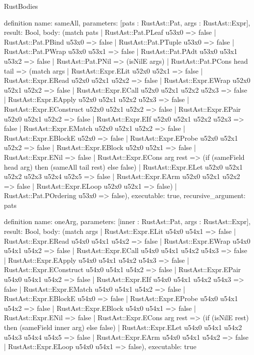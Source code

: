 \begin{lexlean}{RustBodies}
\begin{semanticmodule}
definition{
  name: sameAll,
  parameters: [pats : RustAst::Pat, args : RustAst::Expr],
  result: Bool,
  body: (match pats
    | RustAst::Pat.PLeaf u53x0 => false
    | RustAst::Pat.PBind u53x0 => false
    | RustAst::Pat.PTuple u53x0 => false
    | RustAst::Pat.PWrap u53x0 u53x1 => false
    | RustAst::Pat.PAdt u53x0 u53x1 u53x2 => false
    | RustAst::Pat.PNil => (isNilE args)
    | RustAst::Pat.PCons head tail => (match args
      | RustAst::Expr.ELit u52x0 u52x1 => false
      | RustAst::Expr.ERead u52x0 u52x1 u52x2 => false
      | RustAst::Expr.EWrap u52x0 u52x1 u52x2 => false
      | RustAst::Expr.ECall u52x0 u52x1 u52x2 u52x3 => false
      | RustAst::Expr.EApply u52x0 u52x1 u52x2 u52x3 => false
      | RustAst::Expr.EConstruct u52x0 u52x1 u52x2 => false
      | RustAst::Expr.EPair u52x0 u52x1 u52x2 => false
      | RustAst::Expr.EIf u52x0 u52x1 u52x2 u52x3 => false
      | RustAst::Expr.EMatch u52x0 u52x1 u52x2 => false
      | RustAst::Expr.EBlockE u52x0 => false
      | RustAst::Expr.EProbe u52x0 u52x1 u52x2 => false
      | RustAst::Expr.EBlock u52x0 u52x1 => false
      | RustAst::Expr.ENil => false
      | RustAst::Expr.ECons arg rest => (if (sameField head arg) then (sameAll tail rest) else false)
      | RustAst::Expr.ELet u52x0 u52x1 u52x2 u52x3 u52x4 u52x5 => false
      | RustAst::Expr.EArm u52x0 u52x1 u52x2 => false
      | RustAst::Expr.ELoop u52x0 u52x1 => false)
    | RustAst::Pat.POrdering u53x0 => false),
  executable: true,
  recursive_argument: pats
}

definition{
  name: oneArg,
  parameters: [inner : RustAst::Pat, args : RustAst::Expr],
  result: Bool,
  body: (match args
    | RustAst::Expr.ELit u54x0 u54x1 => false
    | RustAst::Expr.ERead u54x0 u54x1 u54x2 => false
    | RustAst::Expr.EWrap u54x0 u54x1 u54x2 => false
    | RustAst::Expr.ECall u54x0 u54x1 u54x2 u54x3 => false
    | RustAst::Expr.EApply u54x0 u54x1 u54x2 u54x3 => false
    | RustAst::Expr.EConstruct u54x0 u54x1 u54x2 => false
    | RustAst::Expr.EPair u54x0 u54x1 u54x2 => false
    | RustAst::Expr.EIf u54x0 u54x1 u54x2 u54x3 => false
    | RustAst::Expr.EMatch u54x0 u54x1 u54x2 => false
    | RustAst::Expr.EBlockE u54x0 => false
    | RustAst::Expr.EProbe u54x0 u54x1 u54x2 => false
    | RustAst::Expr.EBlock u54x0 u54x1 => false
    | RustAst::Expr.ENil => false
    | RustAst::Expr.ECons arg rest => (if (isNilE rest) then (sameField inner arg) else false)
    | RustAst::Expr.ELet u54x0 u54x1 u54x2 u54x3 u54x4 u54x5 => false
    | RustAst::Expr.EArm u54x0 u54x1 u54x2 => false
    | RustAst::Expr.ELoop u54x0 u54x1 => false),
  executable: true
}


\end{semanticmodule}
\end{lexlean}
